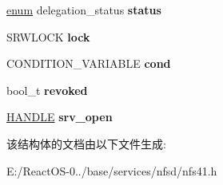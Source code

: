 \begin{DoxyCompactItemize}
\hyperlink{interfaceenum}{enum} delegation\+\_\+status {\bfseries status}
\item 
\mbox{\label{struct____nfs41__delegation__state_aac55cc24067a8a7fb1353fac6790e335}} 
S\+R\+W\+L\+O\+CK {\bfseries lock}
\item 
\mbox{\label{struct____nfs41__delegation__state_a98911e2362f616e124072acc1a1a0258}} 
C\+O\+N\+D\+I\+T\+I\+O\+N\+\_\+\+V\+A\+R\+I\+A\+B\+LE {\bfseries cond}
\item 
\mbox{\label{struct____nfs41__delegation__state_ac492733c16e2e8d2df3282a08b6a7231}} 
bool\+\_\+t {\bfseries revoked}
\item 
\mbox{\label{struct____nfs41__delegation__state_ac2d2cb1eb046e2bced32268e2b9b1fac}} 
\hyperlink{interfacevoid}{H\+A\+N\+D\+LE} {\bfseries srv\+\_\+open}
\end{DoxyCompactItemize}


该结构体的文档由以下文件生成\+:\begin{DoxyCompactItemize}
\item 
E\+:/\+React\+O\+S-\/0../base/services/nfsd/nfs41.\+h\end{DoxyCompactItemize}
